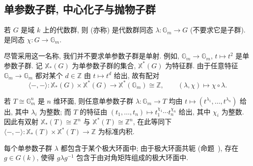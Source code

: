 \subsection{单参数子群, 中心化子与抛物子群}\label{src:B.1.4-subsection}
\begin{definition}[单参数子群与特征]\label{src:B.1.24}
若 $G$ 是域 $k$ 上的代数群, 则 (亦称) 是代数群同态 $\lambda:\mathbb G_m\to G$ (不要求它是子群).  是同态 $\chi:G\to\mathbb G_m$.
\end{definition}
尽管采用这一名称, 我们并不要求单参数子群是单射. 例如, $\mathbb G_m\to\mathbb G_m$, $t\mapsto t^2$ 是单参数子群. 记 $\mathbb X_*(G)$ 为单参数子群的集合, $\mathbb X^*(G)$ 为特征群. 由于任意特征 $\mathbb G_m\to\mathbb G_m$ 都对某个 $d\in\mathbb Z$ 由 $t\mapsto t^d$ 给出, 故有配对
\[
\langle-,-\rangle:\mathbb X_*(G)\times\mathbb X^*(G)\to\mathbb X^*(\mathbb G_m)\cong\mathbb Z,\qquad(\lambda,\chi)\mapsto\chi\circ\lambda.
\]
\begin{example}[环面]\label{src:B.1.25}
若 $T\cong\mathbb G_m^n$ 是 $n$ 维环面, 则任意单参数子群 $\lambda:\mathbb G_m\to T$ 均由 $t\mapsto(t^{\lambda_1},\ldots,t^{\lambda_n})$ 给出, 其中 $\lambda_i$ 为整数; 而 $T$ 的特征由 $(t_1,\ldots,t_n)\mapsto t_1^{\chi_1}\cdots t_n^{\chi_n}$ 给出, 其中 $\chi_i$ 为整数. 因此有双射 $\mathbb X_*(T)\cong\mathbb Z^n$ 与 $\mathbb X^*(T)\cong\mathbb Z^n$, 在此等同下 $\langle-,-\rangle:\mathbb X_*(T)\times\mathbb X^*(T)\to\mathbb Z$ 为标准内积.
\end{example}
\begin{example}\label{src:B.1.26}
每个单参数子群 $\lambda$ 都包含于某个极大环面中; 由于极大环面共轭 (命题~), 存在 $g\in G(k)$, 使得 $g\lambda g^{-1}$ 包含于由对角矩阵组成的极大环面中.
\end{example}
\clearpage
